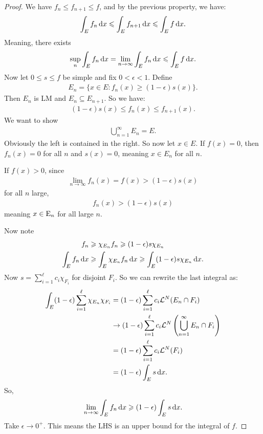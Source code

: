 \documentclass{report}
\begin{document}
\begin{proof}
    We have $f_n \leq f_{n+1} \leq f$, and by the previous property, we have:
    \begin{align*}
        \int_E f_n \, \text dx \leq \int_E f_{n+1} \, \text dx \leq \int_E f \, \text dx.
    \end{align*}
    Meaning, there exists
    \begin{align*}
        \sup_n \int_E f_n \, \text dx = \lim_{n \to \infty} \int_E f_n \, \text dx \leq \int_E f \, \text dx.
    \end{align*}
    Now let $0 \leq s \leq f$ be simple and fix $0 <\epsilon < 1$. Define \begin{align*}
        E_n = \{ x \in E : f_n(x) \geq (1-\epsilon)s(x)\}.
    \end{align*}
    Then $E_n$ is LM and $E_n \subseteq E_{n+1}$. So we have:
    \begin{align*}
        (1-\epsilon)s(x) \leq f_n(x) \leq f_{n+1}(x).
    \end{align*}
    We want to show
    \begin{align*}
        \bigcup_{n=1}^\infty E_n = E.
    \end{align*}
    Obviously the left is contained in the right. So now let $x \in E$. If $f(x) = 0$, then $f_n(x) = 0$ for all $n$ and $s(x) = 0$, meaning $x \in E_n$ for all $n$. 
    
    If $f(x) > 0$, since 
    \begin{align*}
        \lim_{n\to \infty} f_n(x) = f(x) > (1- \epsilon)s(x)
    \end{align*}
    for all $n$ large, 
    \begin{align*}
        f_n(x) > (1-\epsilon)s(x)
    \end{align*}
    meaning $x \in \E_n$ for all large $n$. 

    Now note 
    \begin{align*}
        f_n &\geq \chi_{E_n}f_n \geq (1-\epsilon)s \chi_{E_n} \\ 
        \int_E f_n \, \text dx &\geq \int_E \chi_{E_n} f_n \, \text dx \geq \int_E (1-\epsilon)s \chi_{E_n} \, \text dx.
    \end{align*}
    Now $s = \sum_{i = 1}^\ell c_i \chi_{F_i}$ for disjoint $F_i$. So we can rewrite the last integral as:
    \begin{align*}
        \int_E (1-\epsilon)\sum_{i = 1}^\ell \chi_{E_n}\chi_{F_i} &= (1-\epsilon)\sum_{i=1}^\ell c_i \mathcal L^N(E_n \cap F_i) \\
        &\to (1-\epsilon)\sum_{i=1}^\ell c_i \mathcal L^N\left(\bigcup_{n=1}^\infty E_n \cap F_i\right) \\
        &= (1-\epsilon)\sum_{i=1}^\ell c_i \mathcal L^N(F_i) \\
        &= (1-\epsilon)\int_E s \, \text dx.
    \end{align*}
    So,
    \begin{align*}
        \lim_{n\to \infty} \int_E f_n \, \text dx \geq (1-\epsilon)\int_E s \, \text dx.
    \end{align*}
    Take $\epsilon \to 0^+$. This means the LHS is an upper bound for the integral of $f$. 
\end{proof}
\end{document}
